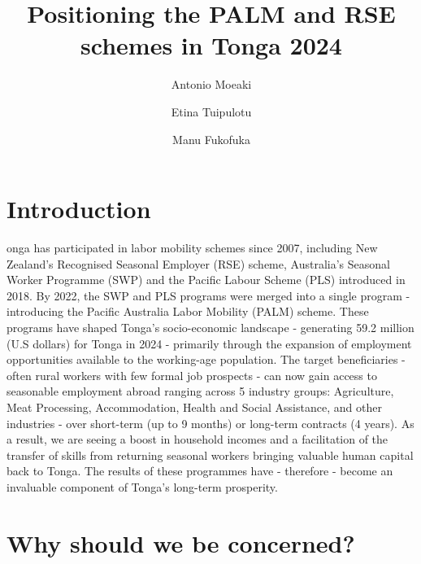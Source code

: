 \documentclass[9pt,a4paper,twocolumn,twoside]{tau-class/tau}
\title{Positioning the PALM and RSE schemes in Tonga 2024}
\author[a,1]{Antonio Moeaki}
\author[a,2]{Etina Tuipulotu}
\author[a,3]{Manu Fukofuka}
\affil[a]{EFPD Economists}
\begin{document}
		
    \maketitle 
    \thispagestyle{firststyle} 
    \tauabstract 
    

\section{Introduction}

    onga has participated in labor mobility schemes since 2007, including New Zealand's Recognised Seasonal Employer (RSE) scheme, Australia’s Seasonal Worker Programme (SWP) and the Pacific Labour Scheme (PLS) introduced in 2018. By 2022, the SWP and PLS programs were merged into a single program - introducing the Pacific Australia Labor Mobility (PALM) scheme. These programs have shaped Tonga's socio-economic landscape - generating 59.2 million (U.S dollars) for Tonga in 2024 - primarily through the expansion of employment opportunities available to the working-age population. The target beneficiaries - often rural workers with few formal job prospects - can now gain access to seasonable employment abroad ranging across 5 industry groups: Agriculture, Meat Processing, Accommodation, Health and Social Assistance, and other industries - over short-term (up to 9 months) or long-term contracts (4 years). As a result, we are seeing a boost in household incomes and a facilitation of the transfer of skills from returning seasonal workers bringing valuable human capital back to Tonga. The results of these programmes have - therefore - become an invaluable component of Tonga's long-term prosperity. %

    

\section{Why should we be concerned?}
\end{document}

